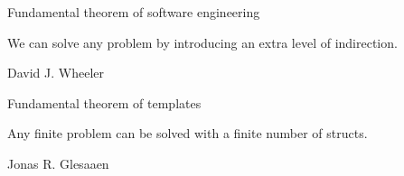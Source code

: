 \documentclass[14pt]{beamer}
\begin{document}
\begin{frame}[fragile]
\begin{onlyenv}
    \nointerlineskip
    
  \end{onlyenv}

\end{frame}

\begin{frame}

  \begin{center}\fontsize{16pt}{16pt}\selectfont\color{Tropiteal}
    Fundamental theorem of software engineering
  \end{center}

  \vspace{.25cm}
  \begin{center}
    \begin{minipage}{8cm}
      We can solve any problem by introducing an extra level of indirection.
    \end{minipage}
  \end{center}

  \vspace{.25cm}
  \begin{flushright}\color{ICantExpress!50!WhiteTrash}
    David J. Wheeler
  \end{flushright}

\end{frame}

\begin{frame}

  \begin{center}\fontsize{16pt}{16pt}\selectfont\color{Tropiteal}
    Fundamental theorem of templates
  \end{center}

  \vspace{.25cm}
  \begin{center}
    \begin{minipage}{8cm}
      Any finite problem can be solved with a finite number of structs.
    \end{minipage}
  \end{center}

  \vspace{.25cm}
  \begin{flushright}\color{ICantExpress!50!WhiteTrash}
    Jonas R. Glesaaen
  \end{flushright}

\end{frame}
\end{document}
